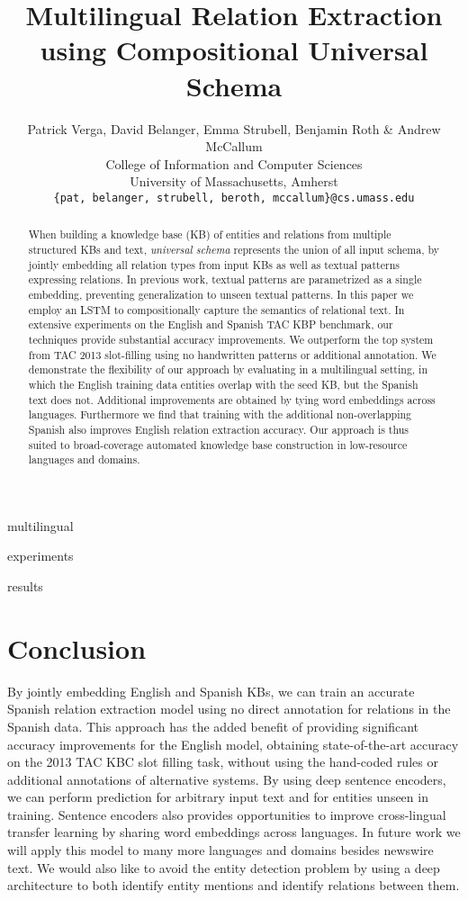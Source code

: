 \documentclass{article} %
\title{Multilingual Relation Extraction using Compositional Universal Schema}
\author{Patrick Verga, David Belanger, Emma Strubell, Benjamin Roth \& Andrew McCallum \\
College of Information and Computer Sciences\\
University of Massachusetts, Amherst\\
\texttt{\{pat, belanger, strubell, beroth, mccallum\}@cs.umass.edu} \\
}
\begin{document}
\maketitle

\begin{abstract}
When building a knowledge base (KB) of entities and relations from multiple structured KBs and text, \emph{universal schema} represents the union of all input schema, by jointly embedding all relation types from input KBs as well as textual patterns expressing relations.  In previous work, textual patterns are parametrized as a single embedding, preventing generalization to unseen textual patterns. In this paper we employ an LSTM to compositionally capture the semantics of relational text. In extensive experiments on the English and Spanish TAC KBP benchmark, our techniques provide substantial accuracy improvements. We outperform the top system from TAC 2013 slot-filling using no handwritten patterns or additional annotation. We demonstrate the flexibility of our approach by evaluating in a multilingual setting, in which the English training data entities overlap with the seed KB, but the Spanish text does not. Additional improvements are obtained by tying word embeddings across languages. Furthermore we find that training with the additional non-overlapping Spanish also improves English relation extraction accuracy. Our approach is thus suited to broad-coverage automated knowledge base construction in low-resource languages and domains.
\end{abstract}






 {multilingual}

 {experiments}

 {results}
\section{Conclusion}

By jointly embedding English and Spanish KBs, we can train an accurate Spanish relation extraction model using no direct annotation for relations in the Spanish data. This approach has the added benefit of providing significant accuracy improvements for the English model, obtaining state-of-the-art accuracy on the 2013 TAC KBC slot filling task, without using the hand-coded rules or additional annotations of alternative systems. By using deep sentence encoders, we can perform prediction for arbitrary input text and for entities unseen in training. Sentence encoders also provides opportunities to improve cross-lingual transfer learning by sharing word embeddings across languages. In future work we will apply this model to many more languages and domains besides newswire text. We would also like to avoid the entity detection problem by using a deep architecture to both identify entity mentions and identify relations between them.
\end{document}
